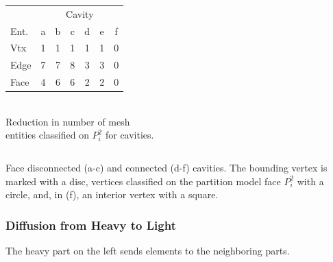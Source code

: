 \documentclass{beamer}
\begin{document}
\begin{frame}
\begin{columns}
\begin{column}{0.3\textwidth}
      \centering 
      \texttt{[image: \{figs/vertexCavities.png]}.eps}\\
    \end{column}
    \begin{column}{0.45\textwidth}
      \tiny
      \begin{tabular}{l|cccccc} 
        & \multicolumn{6}{|c}{Cavity}\\
        Ent. & a & b & c & d & e & f \\
        \hline
        Vtx  & 1 & 1 & 1 & 1 & 1 & 0 \\
        Edge & 7 & 7 & 8 & 3 & 3 & 0 \\
        Face & 4 & 6 & 6 & 2 & 2 & 0 \\
      \end{tabular}\\
      Reduction in number of mesh \\
      entities classified on $P^2_i$ for cavities.
    \end{column}
  \end{columns}
  \tiny
  Face disconnected (a-c) and connected (d-f) cavities.  The bounding vertex is
  marked with a disc, vertices classified on the partition model face $P^2_i$
  with a circle, and, in (f), an interior vertex with a square. 
\end{frame}

\begin{frame}
  \frametitle{Diffusion from Heavy to Light}
  \centering
  The heavy part on the left sends elements to the neighboring parts.
\end{frame}
\end{document}
